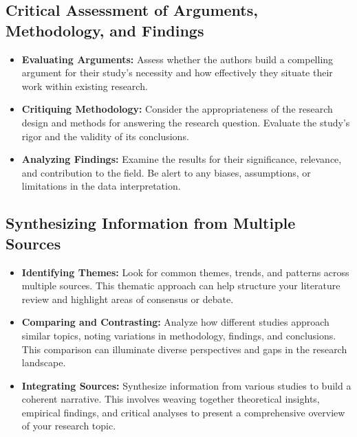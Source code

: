 \documentclass[
]{book}
\begin{document}
\hypertarget{critical-assessment-of-arguments-methodology-and-findings}{%
\subsection{Critical Assessment of Arguments, Methodology, and Findings}\label{critical-assessment-of-arguments-methodology-and-findings}}

\begin{itemize}
\item
  \textbf{Evaluating Arguments:} Assess whether the authors build a compelling argument for their study's necessity and how effectively they situate their work within existing research.
\item
  \textbf{Critiquing Methodology:} Consider the appropriateness of the research design and methods for answering the research question. Evaluate the study's rigor and the validity of its conclusions.
\item
  \textbf{Analyzing Findings:} Examine the results for their significance, relevance, and contribution to the field. Be alert to any biases, assumptions, or limitations in the data interpretation.
\end{itemize}

\hypertarget{synthesizing-information-from-multiple-sources}{%
\subsection*{Synthesizing Information from Multiple Sources}\label{synthesizing-information-from-multiple-sources}}

\begin{itemize}
\item
  \textbf{Identifying Themes:} Look for common themes, trends, and patterns across multiple sources. This thematic approach can help structure your literature review and highlight areas of consensus or debate.
\item
  \textbf{Comparing and Contrasting:} Analyze how different studies approach similar topics, noting variations in methodology, findings, and conclusions. This comparison can illuminate diverse perspectives and gaps in the research landscape.
\item
  \textbf{Integrating Sources:} Synthesize information from various studies to build a coherent narrative. This involves weaving together theoretical insights, empirical findings, and critical analyses to present a comprehensive overview of your research topic.
\end{itemize}
\end{document}
